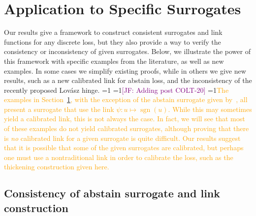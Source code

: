 \documentclass[12pt]{article}
\newcommand{\Comments}{1}
\newcommand{\mynote}[2]{\ifnum\Comments=1\textcolor{#1}{#2}\fi}
\newcommand{\mytodo}[2]{\ifnum\Comments=1%
  \todo[linecolor=#1!80!black,backgroundcolor=#1,bordercolor=#1!80!black]{#2}\fi}
\newcommand{\jessie}[1]{\mynote{purple}{[JF: #1]}}
\newcommand{\proposedadd}[1]{\mynote{orange}{#1}}
\newcommand{\btw}[1]{\mytodo{gray!20!white}{[BTW: #1]}}%
\DeclareMathOperator*{\sgn}{sgn}
\begin{document}
\section{Application to Specific Surrogates}\label{sec:examples}

Our results give a framework to construct consistent surrogates and link functions for any discrete loss, but they also provide a way to verify the consistency or inconsistency of given surrogates.
Below, we illustrate the power of this framework with specific examples from the literature, as well as new examples.
In some cases we simplify existing proofs, while in others we give new results, such as a new calibrated link for abstain loss, and the inconsistency of the recently proposed Lov\'asz hinge.
\btw{RF: The top-k and hypercube/set examples (except abstain) have the link built in, e.g.\ as the sign function), and they just work around it.  Our results may suggest that it's worth thinking ``outside the box'' (HAH, genious...) and looking for embeddings which are not the hypercube. \jessie{Added paragraph to discuss this.}}
\jessie{Adding post COLT-20}
\proposedadd{The examples in Section~\ref{sec:examples}, with the exception of the abstain surrogate given by~\cite{ramaswamy2018consistent}, all present a surrogate that use the link $\psi: u \mapsto \sgn(u)$.
While this may sometimes yield a calibrated link, this is not always the case.
In fact, we will see that most of these examples do not yield calibrated surrogates, although proving that there is \emph{no} calibrated link for a given surrogate is quite difficult.
Our results suggest that it is possible that some of the given surrogates are calibrated, but perhaps one must use a nontraditional link in order to calibrate the loss, such as the thickening construction given here.}


\subsection{Consistency of abstain surrogate and link construction}
\label{sec:abstain}
\end{document}
